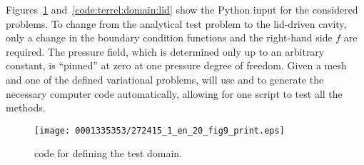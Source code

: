 Figures~\ref{code:terrel:domain:test} and~\ref{code:terrel:domain:lid}
show the \dolfin{} Python input for the considered problems. To change
from the analytical test problem to the lid-driven cavity, only a
change in the boundary condition functions and the right-hand side
$f$ are required.  The pressure field, which is determined only up to
an arbitrary constant, is ``pinned'' at zero at one pressure degree
of freedom.  Given a mesh and one of the defined
variational problems, \dolfin{} will use \ffc{} and \fiat{} to generate
the necessary computer code automatically, allowing for one script to
test all the methods.

\begin{figure}[!p]
\vspace*{-9pt}
\bwfig
\texttt{[image: 0001335353/272415\_1\_en\_20\_fig9\_print.eps]}
\caption{\dolfin{} code for defining the test domain.}
\label{code:terrel:domain:test}
\end{figure}

